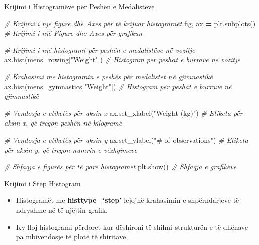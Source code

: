 \documentclass[
  ignorenonframetext,
]{beamer}
\newenvironment{Shaded}{\begin{snugshade}}{\end{snugshade}}
\newcommand{\CommentTok}[1]{\textcolor[rgb]{0.56,0.35,0.01}{\textit{#1}}}
\newcommand{\NormalTok}[1]{#1}
\newcommand{\OperatorTok}[1]{\textcolor[rgb]{0.81,0.36,0.00}{\textbf{#1}}}
\newcommand{\StringTok}[1]{\textcolor[rgb]{0.31,0.60,0.02}{#1}}
\begin{document}
\begin{frame}[fragile]{Krijimi i Histogramëve për Peshën e Medalistëve}
\begin{Shaded}
\begin{Highlighting}[]
\CommentTok{\# Krijimi i një figure dhe Axes për të krijuar histogramët}
\NormalTok{fig, ax }\OperatorTok{=}\NormalTok{ plt.subplots()  }\CommentTok{\# Krijimi i një Figure dhe Axes për grafikun}

\CommentTok{\# Krijimi i një histogrami për peshën e medalistëve në vozitje}
\NormalTok{ax.hist(mens\_rowing[}\StringTok{"Weight"}\NormalTok{])  }\CommentTok{\# Histogram për peshat e burrave në vozitje}

\CommentTok{\# Krahasimi me histogramin e peshës për medalistët në gjimnastikë}
\NormalTok{ax.hist(mens\_gymnastics[}\StringTok{"Weight"}\NormalTok{])  }\CommentTok{\# Histogram për peshat e burrave në gjimnastikë}

\CommentTok{\# Vendosja e etiketës për aksin x}
\NormalTok{ax.set\_xlabel(}\StringTok{"Weight (kg)"}\NormalTok{)  }\CommentTok{\# Etiketa për aksin x, që tregon peshën në kilogramë}

\CommentTok{\# Vendosja e etiketës për aksin y}
\NormalTok{ax.set\_ylabel(}\StringTok{"\# of observations"}\NormalTok{)  }\CommentTok{\# Etiketa për aksin y, që tregon numrin e vëzhgimeve}

\CommentTok{\# Shfaqja e figurës për të parë histogramët}
\NormalTok{plt.show()  }\CommentTok{\# Shfaqja e grafikëve}
\end{Highlighting}
\end{Shaded}
\end{frame}

\begin{frame}{Krijimi i Step Histogram}
\protect\hypertarget{krijimi-i-step-histogram}{}
\begin{itemize}
\item
  Histogramët me \textbf{histtype=`step'} lejojnë krahasimin e
  shpërndarjeve të ndryshme në të njëjtin grafik.
\item
  Ky lloj histogrami përdoret kur dëshironi të shihni strukturën e të
  dhënave pa mbivendosje të plotë të shiritave.
\end{itemize}
\end{frame}
\end{document}
